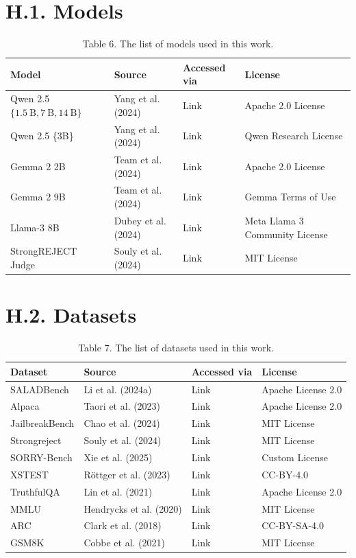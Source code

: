 \documentclass[10pt]{article}
\begin{document}
\section*{H.1. Models}
\begin{table}[h]
\begin{center}
\captionsetup{labelformat=empty}
\caption{Table 6. The list of models used in this work.}
\begin{tabular}{|l|l|l|l|}
\hline
Model & Source & Accessed via & License \\
\hline
Qwen 2.5 $\{1.5 \mathrm{~B}, 7 \mathrm{~B}, 14 \mathrm{~B}\}$ & Yang et al. (2024) & Link & Apache 2.0 License \\
\hline
Qwen 2.5 \{3B\} & Yang et al. (2024) & Link & Qwen Research License \\
\hline
Gemma 2 2B & Team et al. (2024) & Link & Apache 2.0 License \\
\hline
Gemma 2 9B & Team et al. (2024) & Link & Gemma Terms of Use \\
\hline
Llama-3 8B & Dubey et al. (2024) & Link & Meta Llama 3 Community License \\
\hline
StrongREJECT Judge & Souly et al. (2024) & Link & MIT License \\
\hline
\end{tabular}
\end{center}
\end{table}

\section*{H.2. Datasets}
\begin{table}[h]
\begin{center}
\captionsetup{labelformat=empty}
\caption{Table 7. The list of datasets used in this work.}
\begin{tabular}{|l|l|l|l|}
\hline
Dataset & Source & Accessed via & License \\
\hline
SALADBench & Li et al. (2024a) & Link & Apache License 2.0 \\
\hline
Alpaca & Taori et al. (2023) & Link & Apache License 2.0 \\
\hline
JailbreakBench & Chao et al. (2024) & Link & MIT License \\
\hline
Strongreject & Souly et al. (2024) & Link & MIT License \\
\hline
SORRY-Bench & Xie et al. (2025) & Link & Custom License \\
\hline
XSTEST & Röttger et al. (2023) & Link & CC-BY-4.0 \\
\hline
TruthfulQA & Lin et al. (2021) & Link & Apache License 2.0 \\
\hline
MMLU & Hendrycks et al. (2020) & Link & MIT License \\
\hline
ARC & Clark et al. (2018) & Link & CC-BY-SA-4.0 \\
\hline
GSM8K & Cobbe et al. (2021) & Link & MIT License \\
\hline
\end{tabular}
\end{center}
\end{table}
\end{document}
